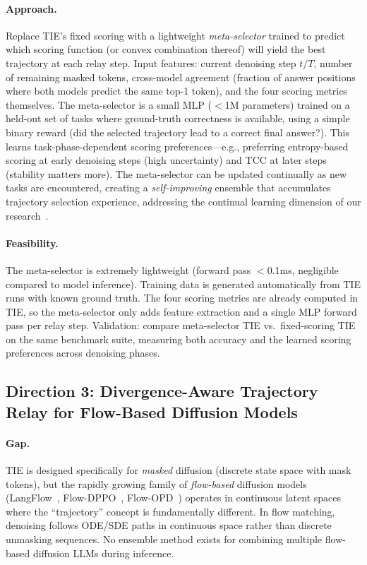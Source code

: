 \documentclass[11pt,a4paper]{article}
\begin{document}
\paragraph{Approach.} Replace TIE's fixed scoring with a lightweight \emph{meta-selector} trained to predict which scoring function (or convex combination thereof) will yield the best trajectory at each relay step. Input features: current denoising step $t/T$, number of remaining masked tokens, cross-model agreement (fraction of answer positions where both models predict the same top-1 token), and the four scoring metrics themselves. The meta-selector is a small MLP ($<$1M parameters) trained on a held-out set of tasks where ground-truth correctness is available, using a simple binary reward (did the selected trajectory lead to a correct final answer?). This learns task-phase-dependent scoring preferences---e.g., preferring entropy-based scoring at early denoising steps (high uncertainty) and TCC at later steps (stability matters more). The meta-selector can be updated continually as new tasks are encountered, creating a \emph{self-improving} ensemble that accumulates trajectory selection experience, addressing the continual learning dimension of our research~\cite{liu2026continual}.

\paragraph{Feasibility.} The meta-selector is extremely lightweight (forward pass $<$0.1ms, negligible compared to model inference). Training data is generated automatically from TIE runs with known ground truth. The four scoring metrics are already computed in TIE, so the meta-selector only adds feature extraction and a single MLP forward pass per relay step. Validation: compare meta-selector TIE vs.\ fixed-scoring TIE on the same benchmark suite, measuring both accuracy and the learned scoring preferences across denoising phases.

\subsection{Direction 3: Divergence-Aware Trajectory Relay for Flow-Based Diffusion Models}

\paragraph{Gap.} TIE is designed specifically for \emph{masked} diffusion (discrete state space with mask tokens), but the rapidly growing family of \emph{flow-based} diffusion models (LangFlow~\cite{ye2026langflow}, Flow-DPPO~\cite{ping2026flowdppo}, Flow-OPD~\cite{wu2026flowopd}) operates in continuous latent spaces where the ``trajectory'' concept is fundamentally different. In flow matching, denoising follows ODE/SDE paths in continuous space rather than discrete unmasking sequences. No ensemble method exists for combining multiple flow-based diffusion LLMs during inference.
\end{document}

